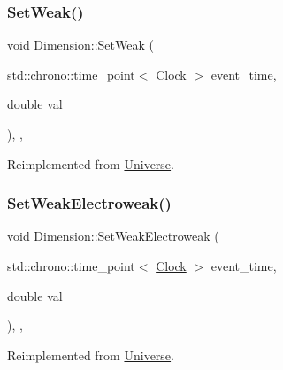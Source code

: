 \mbox{\label{classDimension_a157cfa28dd6bc5518d622d01445ca827}} 
\subsubsection{\texorpdfstring{Set\+Weak()}{SetWeak()}}
{\footnotesize\ttfamily void Dimension\+::\+Set\+Weak (\begin{DoxyParamCaption}\item[{std\+::chrono\+::time\+\_\+point$<$ \mbox{\hyperlink{universe_8h_a0ef8d951d1ca5ab3cfaf7ab4c7a6fd80}{Clock}} $>$}]{event\+\_\+time,  }\item[{double}]{val }\end{DoxyParamCaption})\hspace{0.3cm}{\ttfamily [inline]}, {\ttfamily [final]}, {\ttfamily [virtual]}}



Reimplemented from \mbox{\hyperlink{classUniverse_a0f5cd04081b41ee931c0557dc397f6fb}{Universe}}.

\mbox{\label{classDimension_a1d2accef9e6adf747f5cc143ae4527c9}} 
\subsubsection{\texorpdfstring{Set\+Weak\+Electroweak()}{SetWeakElectroweak()}}
{\footnotesize\ttfamily void Dimension\+::\+Set\+Weak\+Electroweak (\begin{DoxyParamCaption}\item[{std\+::chrono\+::time\+\_\+point$<$ \mbox{\hyperlink{universe_8h_a0ef8d951d1ca5ab3cfaf7ab4c7a6fd80}{Clock}} $>$}]{event\+\_\+time,  }\item[{double}]{val }\end{DoxyParamCaption})\hspace{0.3cm}{\ttfamily [inline]}, {\ttfamily [final]}, {\ttfamily [virtual]}}



Reimplemented from \mbox{\hyperlink{classUniverse_a2d3d642bfdc863248e93535832fa4b00}{Universe}}.

\mbox{\label{classDimension_ab39b7ff253ade59c5c2d807c511b4028}} 
